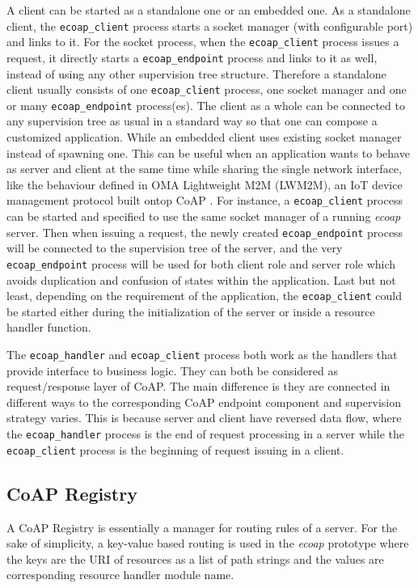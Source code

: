 A client can be started as a standalone one or an embedded one. As a standalone client, the \verb|ecoap_client| process starts a socket manager (with configurable port) and links to it. For the socket process, when the \verb|ecoap_client| process issues a request, it directly starts a \verb|ecoap_endpoint| process and links to it as well, instead of using any other supervision tree structure. Therefore a standalone client usually consists of one \verb|ecoap_client| process, one socket manager and one or many \verb|ecoap_endpoint| process(es). The client as a whole can be connected to any supervision tree as usual in a standard way so that one can compose a customized application. While an embedded client uses existing socket manager instead of spawning one. This can be useful when an application wants to behave as server and client at the same time while sharing the single network interface, like the behaviour defined in OMA Lightweight M2M (LWM2M), an IoT device management protocol built ontop CoAP \cite{}. For instance, a \verb|ecoap_client| process can be started and specified to use the same socket manager of a running \textit{ecoap} server. Then when issuing a request, the newly created \verb|ecoap_endpoint| process will be connected to the supervision tree of the server, and the very \verb|ecoap_endpoint| process will be used for both client role and server role which avoids duplication and confusion of states within the application. Last but not least, depending on the requirement of the application, the \verb|ecoap_client| could be started either during the initialization of the server or inside a resource handler function.

The \verb|ecoap_handler| and \verb|ecoap_client| process both work as the handlers that provide interface to business logic. They can both be considered as request/response layer of CoAP. The main difference is they are connected in different ways to the corresponding CoAP endpoint component and supervision strategy varies. This is because server and client have reversed data flow, where the \verb|ecoap_handler|  process is the end of request processing in a server while the \verb|ecoap_client| process is the beginning of request issuing in a client.

\subsection{CoAP Registry}

A CoAP Registry is essentially a manager for routing rules of a server. For the sake of simplicity, a key-value based routing is used in the \textit{ecoap} prototype where the keys are the URI of resources as a list of path strings and the values are corresponding resource handler module name. 

